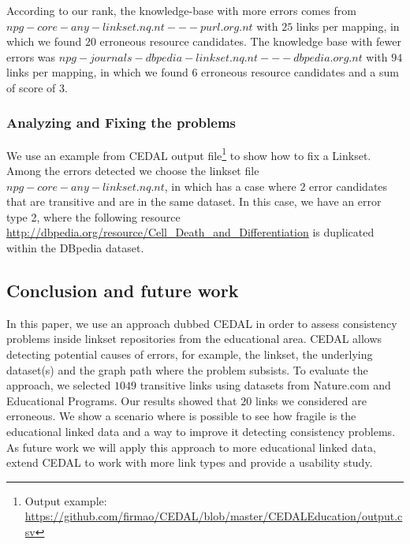 %
According to our rank, the knowledge-base with more errors comes from $npg-core-any-linkset.nq.nt---purl.org.nt$ with $25$ links per mapping, in which we found $20$ erroneous resource candidates. The knowledge base with fewer errors was $npg-journals-dbpedia-linkset.nq.nt---dbpedia.org.nt$ with $94$ links per mapping, in which we found $6$ erroneous resource candidates and a sum of score of $3$.

\subsubsection{Analyzing and Fixing the problems}
We use an example from CEDAL output file\footnote{Output example: \url{https://github.com/firmao/CEDAL/blob/master/CEDALEducation/output.csv}} to show how to fix a Linkset. Among the errors detected we choose the linkset file $npg-core-any-linkset.nq.nt$, in which has a case where $2$ error candidates that are transitive and are in the same dataset. In this case, we have an error type 2, where the following resource \url{http://dbpedia.org/resource/Cell_Death_and_Differentiation} is duplicated within the DBpedia dataset. 



\subsection{Conclusion and future work}
In this paper, we use an approach dubbed CEDAL in order to assess consistency problems inside linkset repositories from the educational area. CEDAL allows detecting potential causes of errors, for example, the linkset, the underlying dataset(s) and the graph path where the problem subsists.
To evaluate the approach, we selected $1049$ transitive links using datasets from Nature.com and Educational Programs. Our results showed that $20$ links we considered are erroneous.
We show a scenario where is possible to see how fragile is the educational linked data and a way to improve it detecting consistency problems.
As future work we will apply this approach to more educational linked data, extend CEDAL to work with more link types and provide a usability study.
